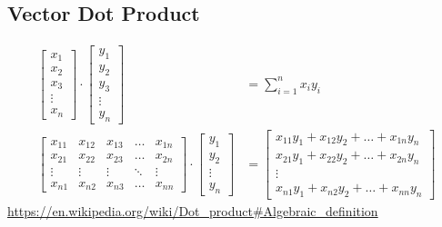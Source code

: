 \documentclass[titlepage]{article}
\begin{document}
\subsection{Vector Dot Product}
\begin{align} 
    \begin{bmatrix}
        x_1\\
        x_2\\
        x_3\\
        \vdots\\
        x_n
    \end{bmatrix}
    \cdot
    \begin{bmatrix}
        y_1\\
        y_2\\
        y_3\\
        \vdots\\
        y_n
    \end{bmatrix}
    &= \sum_{i=1}^{n} x_iy_i 
    \label{eq:vector-dot-product}
    \\
    \begin{bmatrix}
        x_{11}&x_{12}&x_{13}&\dots&x_{1n}\\
        x_{21}&x_{22}&x_{23}&\dots&x_{2n}\\
        \vdots&\vdots&\vdots&\ddots&\vdots\\
        x_{n1}&x_{n2}&x_{n3}&\dots&x_{nn}
    \end{bmatrix}
    \cdot
    \begin{bmatrix}
        y_1\\
        y_2\\
        \vdots\\
        y_n
    \end{bmatrix}
    &=
    \begin{bmatrix}
        x_{11}y_1+x_{12}y_2+\dots+x_{1n}y_n\\
        x_{21}y_1+x_{22}y_2+\dots+x_{2n}y_n\\
        \vdots\\
        x_{n1}y_1+x_{n2}y_2+\dots+x_{nn}y_n
    \end{bmatrix}
    \label{eq:vector-dot-product-2}
\end{align}
\url{https://en.wikipedia.org/wiki/Dot_product#Algebraic_definition}
\end{document}
